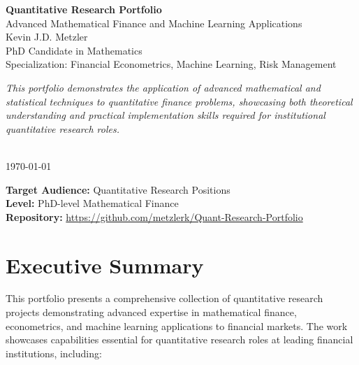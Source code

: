 \documentclass[12pt,a4paper]{article}
\begin{document}
\begin{titlepage}
    \centering
    \vspace*{2cm}
    
    {\Huge\bfseries Quantitative Research Portfolio}\\[0.5cm]
    {\large Advanced Mathematical Finance and Machine Learning Applications}\\[2cm]
    
    {\Large Kevin J.D. Metzler}\\[0.5cm]
    {\large PhD Candidate in Mathematics}\\
    {\large Specialization: Financial Econometrics, Machine Learning, Risk Management}\\[2cm]
    
    \begin{minipage}{0.8\textwidth}
        \centering
        \textit{This portfolio demonstrates the application of advanced mathematical and statistical techniques to quantitative finance problems, showcasing both theoretical understanding and practical implementation skills required for institutional quantitative research roles.}
    \end{minipage}\\[3cm]
    
    {\large \today}\\[1cm]
    
    \vfill
    
    {\small 
    \textbf{Target Audience:} Quantitative Research Positions\\
    \textbf{Level:} PhD-level Mathematical Finance\\
    \textbf{Repository:} \url{https://github.com/metzlerk/Quant-Research-Portfolio}
    }
\end{titlepage}

\newpage

\tableofcontents
\newpage

\section{Executive Summary}

This portfolio presents a comprehensive collection of quantitative research projects demonstrating advanced expertise in mathematical finance, econometrics, and machine learning applications to financial markets. The work showcases capabilities essential for quantitative research roles at leading financial institutions, including:
\end{document}
